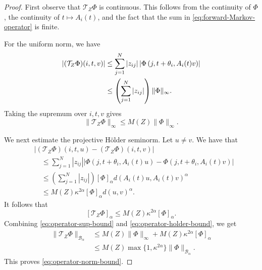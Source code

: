 \documentclass[10pt,a4paper]{amsart}
\newcommand{\R}{\mathbb R}
\begin{document}
\begin{proof}
First observe that \(\mathcal T_Z\Phi\) is continuous.  This follows
from the continuity of \(\Phi\), the continuity of \(t\mapsto A_i(t)\),
and the fact that the sum in
\eqref{eq:forward-Markov-operator} is finite.

For the uniform norm, we have
\begin{align}
 |(\mathcal T_Z\Phi)(i,t, v)|
 &\leq
 \sum_{j=1}^N|z_{ij}|
 \left|
 \Phi\left(
 j,t+\theta_i,A_i(t)v
 \right)
 \right|
 \notag\\
 &\leq
 \left(\sum_{j=1}^N|z_{ij}|\right)
 \|\Phi\|_\infty.
\end{align}
Taking the supremum over \(i,t, v\) gives
\begin{equation}\label{eq:operator-sup-bound}
 \|\mathcal T_Z\Phi\|_\infty
 \leq
 M(Z)\|\Phi\|_\infty.
\end{equation}

We next estimate the projective Hölder seminorm.%
Let \( u\neq  v\).  We have that
\begin{align*}
 &\left|
 (\mathcal T_Z\Phi)(i,t,u)
 -
 (\mathcal T_Z\Phi)(i,t, v)
 \right|
 \\
 &\quad\leq
 \sum_{j=1}^N|z_{ij}|
 \left|
 \Phi\left(
 j,t+\theta_i, A_i(t)u
 \right)
 -
 \Phi\left(
 j,t+\theta_i,A_i(t)v
 \right)
 \right|
 \\
 &\quad\leq
 \left(\sum_{j=1}^N|z_{ij}|\right)
 [\Phi]_\alpha
 d\left( A_i(t)u, A_i(t)v
 \right)^\alpha
 \\
 &\quad\leq
 M(Z)\kappa^{2\alpha}
 [\Phi]_\alpha
 d(u, v)^\alpha.
\end{align*}
It follows that
\begin{equation}\label{eq:operator-holder-bound}
 [\mathcal T_Z\Phi]_\alpha
 \leq
 M(Z)\kappa^{2\alpha}[\Phi]_\alpha.
\end{equation}
Combining \eqref{eq:operator-sup-bound} and
\eqref{eq:operator-holder-bound}, we get
\begin{align*}
 \|\mathcal T_Z\Phi\|_{\mathcal B_\alpha}
 &\leq
 M(Z)\|\Phi\|_\infty
 +
 M(Z)\kappa^{2\alpha}[\Phi]_\alpha\\
 &\leq
 M(Z)\max\{1,\kappa^{2\alpha}\}
 \|\Phi\|_{\mathcal B_\alpha}.
\end{align*}
This proves \eqref{eq:operator-norm-bound}.


\end{proof}
\end{document}
